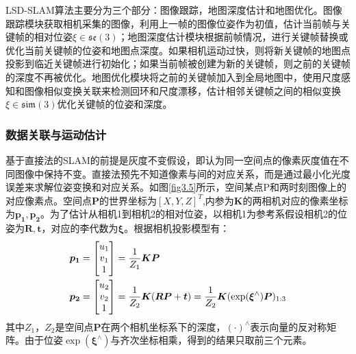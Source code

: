 LSD-SLAM算法主要分为三个部分：图像跟踪，地图深度估计和地图优化。图像跟踪模块获取相机采集的图像，利用上一帧的图像位姿作为初值，估计当前帧与关键帧的相对位姿$\xi \in \mathfrak{se}(3) $；地图深度估计模块根据前帧情况，进行关键帧替换或优化当前关键帧的位姿和地图点深度。如果相机运动过快，则将新关键帧的地图点投影到临近关键帧进行初始化；如果当前帧被创建为新的关键帧，则之前的关键帧的深度不再被优化。地图优化模块将之前的关键帧加入到全局地图中，使用尺度感知和图像相似变换关联来检测回环和尺度漂移，估计相邻关键帧之间的相似变换$\xi \in \mathfrak{sim}(3)$优化关键帧的位姿和深度。

\subsubsection*{数据关联与运动估计}
基于直接法的SLAM的前提是灰度不变假设，即认为同一空间点的像素灰度值在不同图像中保持不变。直接法预先不知道像素与间的对应关系，而是通过最小化光度误差来求解位姿变换和对应关系。如图\ref{fig3.5}所示，空间某点P和两时刻图像上的对应像素点。空间点$\boldsymbol{P}$的世界坐标为$[X,Y,Z]^T$,内参为$\boldsymbol{K}$的两相机对应的像素坐标为$\boldsymbol{p_1},\boldsymbol{p_2}$。为了估计从相机1到相机2的相对位姿，以相机1为参考系假设相机2的位姿为$\boldsymbol{R},\boldsymbol{t}$，对应的李代数为$\boldsymbol{\xi}$。根据相机投影模型有：
\begin{equation}
\label{equ3.8}
\begin{aligned}
& \boldsymbol{p_1} = 
\begin{bmatrix}
u_1 \cr v_1 \cr 1 \cr 
\end{bmatrix}
={1 \over Z_1} \boldsymbol{K} \boldsymbol{P}
\\
& \boldsymbol{p_2} = 
\begin{bmatrix}
u_2 \cr v_2 \cr 1 \cr
\end{bmatrix}
={1 \over Z_2} \boldsymbol{K} ( \boldsymbol{R} \boldsymbol{P}+\boldsymbol{t}) = {1 \over Z_2} \boldsymbol{K} ( \exp (\boldsymbol{\xi}^{\wedge}) \boldsymbol{P})_{1:3}
\end{aligned}
\end{equation}
其中$Z_1$，$Z_2$是空间点$\boldsymbol{P}$在两个相机坐标系下的深度，$(\cdot)^{\wedge}$表示向量的反对称矩阵。由于位姿$\exp(\boldsymbol{\xi}^{\wedge})$与齐次坐标相乘，得到的结果只取前三个元素。

